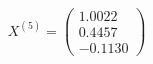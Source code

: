 \documentclass[preview]{standalone}
\begin{document}
\begin{align*}
X^{(5)} = \begin{pmatrix} 1.0022 \\ 0.4457 \\ -0.1130 \end{pmatrix}
\end{align*}
\end{document}
